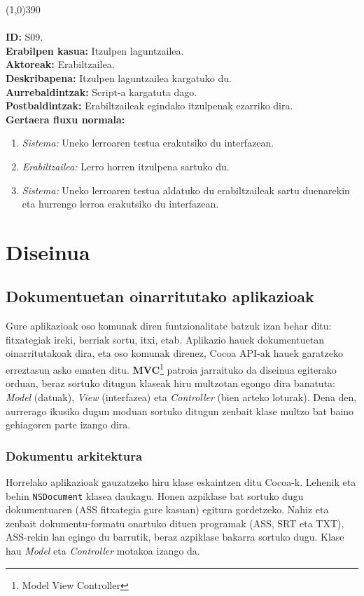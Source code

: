 \line(1,0){390}\\
\noindent\\
\textbf{ID:} S09.\\
\textbf{Erabilpen kasua:} Itzulpen laguntzailea.\\
\textbf{Aktoreak:} Erabiltzailea.\\
\textbf{Deskribapena:} Itzulpen laguntzailea kargatuko du.\\
\textbf{Aurrebaldintzak:} Script-a kargatuta dago.\\
\textbf{Postbaldintzak:} Erabiltzaileak egindako itzulpenak ezarriko dira.\\
\textbf{Gertaera fluxu normala:}
\begin{enumerate}
	\item \textit{Sistema:} Uneko lerroaren testua erakutsiko du interfazean.
	\item \textit{Erabiltzailea:} Lerro horren itzulpena sartuko du.
	\item \textit{Sistema:} Uneko lerroaren testua aldatuko du erabiltzaileak sartu duenarekin eta hurrengo lerroa erakutsiko du interfazean.
\end{enumerate}

\newpage
\section{Diseinua}
\subsection{Dokumentuetan oinarritutako aplikazioak}
Gure aplikazioak oso komunak diren funtzionalitate batzuk izan behar ditu: fitxategiak ireki, berriak sortu, itxi, etab. Aplikazio hauek dokumentuetan oinarritutakoak dira, eta oso komunak direnez, Cocoa API-ak hauek garatzeko erreztasun asko ematen ditu. \textbf{MVC}\footnote{Model View Controller} patroia jarraituko da diseinua egiterako orduan, beraz sortuko ditugun klaseak hiru multzotan egongo dira banatuta: \textit{Model} (datuak), \textit{View} (interfazea) eta \textit{Controller} (bien arteko loturak). Dena den, aurrerago ikusiko dugun moduan sortuko ditugun zenbait klase multzo bat baino gehiagoren parte izango dira.
\subsubsection{Dokumentu arkitektura}
Horrelako aplikazioak gauzatzeko hiru klase eskaintzen ditu Cocoa-k. Lehenik eta behin \texttt{NSDocument} klasea daukagu. Honen azpiklase bat sortuko dugu dokumentuaren (ASS fitxategia gure kasuan) egitura gordetzeko. Nahiz eta zenbait dokumentu-formatu onartuko dituen programak (ASS, SRT eta TXT), ASS-rekin lan egingo du barrutik, beraz azpiklase bakarra sortuko dugu. Klase hau \textit{Model} eta \textit{Controller} motakoa izango da.

